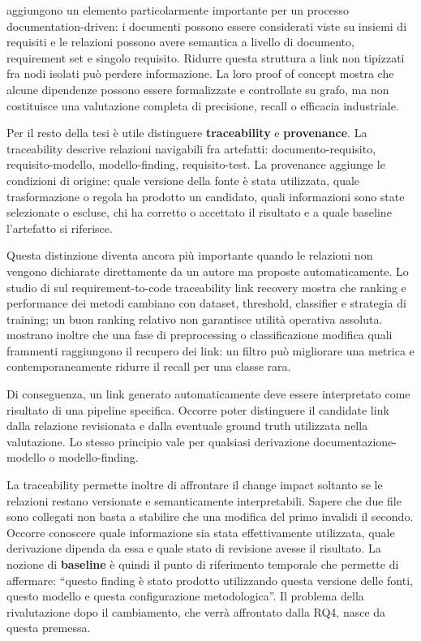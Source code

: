 \documentclass[12pt,a4paper,oneside]{report}
\begin{document}
\citet{grosser2022documentrelations} aggiungono un elemento particolarmente importante per un processo documentation-driven: i documenti possono essere considerati viste su insiemi di requisiti e le relazioni possono avere semantica a livello di documento, requirement set e singolo requisito. Ridurre questa struttura a link non tipizzati fra nodi isolati può perdere informazione. La loro proof of concept mostra che alcune dipendenze possono essere formalizzate e controllate su grafo, ma non costituisce una valutazione completa di precisione, recall o efficacia industriale.

Per il resto della tesi è utile distinguere \textbf{traceability} e \textbf{provenance}. La traceability descrive relazioni navigabili fra artefatti: documento-requisito, requisito-modello, modello-finding, requisito-test. La provenance aggiunge le condizioni di origine: quale versione della fonte è stata utilizzata, quale trasformazione o regola ha prodotto un candidato, quali informazioni sono state selezionate o escluse, chi ha corretto o accettato il risultato e a quale baseline l'artefatto si riferisce.

Questa distinzione diventa ancora più importante quando le relazioni non vengono dichiarate direttamente da un autore ma proposte automaticamente. Lo studio di \citet{wang2024rctlrsota} sul requirement-to-code traceability link recovery mostra che ranking e performance dei metodi cambiano con dataset, threshold, classifier e strategia di training; un buon ranking relativo non garantisce utilità operativa assoluta. \citet{hey2024requirementsclassification} mostrano inoltre che una fase di preprocessing o classificazione modifica quali frammenti raggiungono il recupero dei link: un filtro può migliorare una metrica e contemporaneamente ridurre il recall per una classe rara.

Di conseguenza, un link generato automaticamente deve essere interpretato come risultato di una pipeline specifica. Occorre poter distinguere il candidate link dalla relazione revisionata e dalla eventuale ground truth utilizzata nella valutazione. Lo stesso principio vale per qualsiasi derivazione documentazione-modello o modello-finding.

La traceability permette inoltre di affrontare il change impact soltanto se le relazioni restano versionate e semanticamente interpretabili. Sapere che due file sono collegati non basta a stabilire che una modifica del primo invalidi il secondo. Occorre conoscere quale informazione sia stata effettivamente utilizzata, quale derivazione dipenda da essa e quale stato di revisione avesse il risultato. La nozione di \textbf{baseline} è quindi il punto di riferimento temporale che permette di affermare: ``questo finding è stato prodotto utilizzando questa versione delle fonti, questo modello e questa configurazione metodologica''. Il problema della rivalutazione dopo il cambiamento, che verrà affrontato dalla RQ4, nasce da questa premessa.
\end{document}
